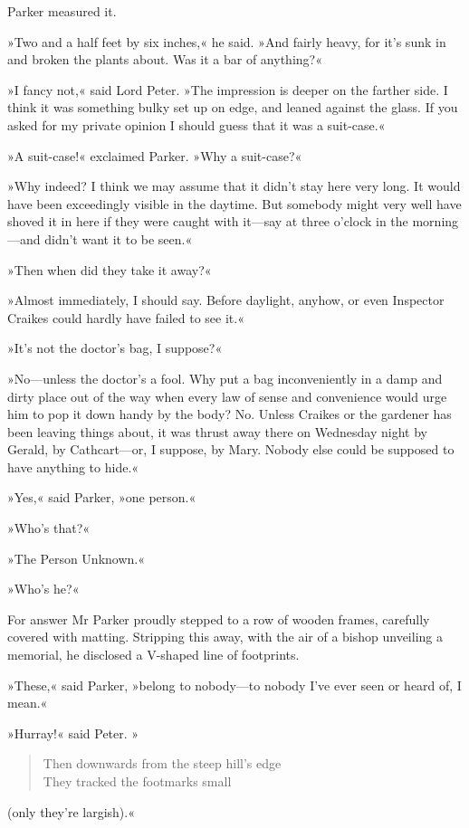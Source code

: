 Parker measured it.

»Two and a half feet by six inches,« he said. »And fairly heavy, for it's sunk in and broken the plants about. Was it a bar of anything?«

»I fancy not,« said Lord Peter. »The impression is deeper on the farther side. I think it was something bulky set up on edge, and leaned against the glass. If you asked for my private opinion I should guess that it was a suit-case.«

»A suit-case!« exclaimed Parker. »Why a suit-case?«

»Why indeed? I think we may assume that it didn't stay here very long. It would have been exceedingly visible in the daytime. But somebody might very well have shoved it in here if they were caught with it—say at three o'clock in the morning—and didn't want it to be seen.«

»Then when did they take it away?«

»Almost immediately, I should say. Before daylight, anyhow, or even Inspector Craikes could hardly have failed to see it.«

»It's not the doctor's bag, I suppose?«

»No—unless the doctor's a fool. Why put a bag inconveniently in a damp and dirty place out of the way when every law of sense and convenience would urge him to pop it down handy by the body? No. Unless Craikes or the gardener has been leaving things about, it was thrust away there on Wednesday night by Gerald, by Cathcart—or, I suppose, by Mary. Nobody else could be supposed to have anything to hide.«

»Yes,« said Parker, »one person.«

»Who's that?«

»The Person Unknown.«

»Who's he?«

For answer Mr Parker proudly stepped to a row of wooden frames, carefully covered with matting. Stripping this away, with the air of a bishop unveiling a memorial, he disclosed a V-shaped line of footprints.

»These,« said Parker, »belong to nobody—to nobody I've ever seen or heard of, I mean.«

»Hurray!« said Peter. »
\begin{verse}
Then downwards from the steep hill's edge\\
They tracked the footmarks small
\end{verse}
(only they're largish).«

